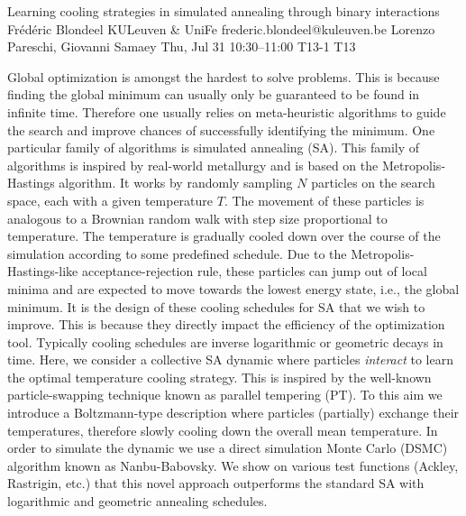 \documentclass[12pt,lettersize,oneside]{book} %
\begin{document}
\begin{talk}
  {Learning cooling strategies in simulated annealing through binary interactions}%
  {Fr\'ed\'eric Blondeel}%
  {KULeuven \& UniFe}%
  {frederic.blondeel@kuleuven.be}%
  {Lorenzo Pareschi, Giovanni Samaey}%
  {}%
  {Thu, Jul 31 10:30--11:00}%
  {T13-1}%
  {T13}%
  
    
   
Global optimization is amongst the hardest to solve problems. This is because finding the global minimum can usually only be guaranteed to be found in infinite time. Therefore one usually relies on meta-heuristic algorithms to guide the search and improve chances of successfully identifying the minimum. One particular family of algorithms is simulated annealing (SA). This family of algorithms is inspired by real-world metallurgy and is based on the Metropolis-Hastings algorithm. It works by randomly sampling $N$ particles on the search space, each with a given temperature $T$. The movement of these particles is analogous to a Brownian random walk with step size proportional to temperature. The temperature is gradually cooled down over the course of the simulation according to some predefined schedule. Due to the Metropolis-Hastings-like acceptance-rejection rule, these particles can jump out of local minima and are expected to move towards the lowest energy state, i.e., the global minimum. It is the design of these cooling schedules for SA that we wish to improve. This is because they directly impact the efficiency of the optimization tool. Typically cooling schedules are inverse logarithmic or geometric decays in time. Here, we consider a collective SA dynamic where particles \textit{interact} to learn the optimal temperature cooling strategy. This is inspired by the well-known particle-swapping technique known as parallel tempering (PT). To this aim we introduce a Boltzmann-type description where particles (partially) exchange their temperatures, therefore slowly cooling down the overall mean temperature. In order to simulate the dynamic we use a direct simulation Monte Carlo (DSMC) algorithm known as Nanbu-Babovsky. We show on various test functions (Ackley, Rastrigin, etc.) that this novel approach outperforms the standard SA with logarithmic and geometric annealing schedules.

\end{talk}
\end{document}
